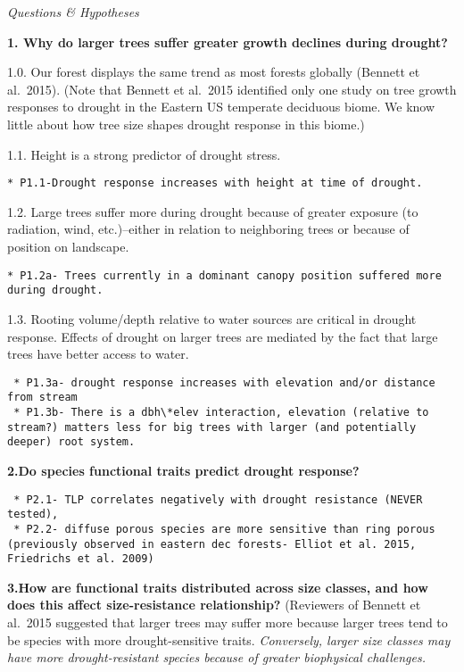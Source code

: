 \documentclass[]{book}
\begin{document}
\emph{Questions \& Hypotheses}

\textbf{1. Why do larger trees suffer greater growth declines during drought?}

1.0. Our forest displays the same trend as most forests globally (Bennett et al.~2015). (Note that Bennett et al.~2015 identified only one study on tree growth responses to drought in the Eastern US temperate deciduous biome. We know little about how tree size shapes drought response in this biome.)

1.1. Height is a strong predictor of drought stress.

\begin{verbatim}
* P1.1-Drought response increases with height at time of drought.
\end{verbatim}

1.2. Large trees suffer more during drought because of greater exposure (to radiation, wind, etc.)--either in relation to neighboring trees or because of position on landscape.

\begin{verbatim}
* P1.2a- Trees currently in a dominant canopy position suffered more during drought. 
\end{verbatim}

1.3. Rooting volume/depth relative to water sources are critical in drought response. Effects of drought on larger trees are mediated by the fact that large trees have better access to water.

\begin{verbatim}
 * P1.3a- drought response increases with elevation and/or distance from stream
 * P1.3b- There is a dbh\*elev interaction, elevation (relative to stream?) matters less for big trees with larger (and potentially deeper) root system.
\end{verbatim}

\textbf{2.Do species functional traits predict drought response?}

\begin{verbatim}
 * P2.1- TLP correlates negatively with drought resistance (NEVER tested), 
 * P2.2- diffuse porous species are more sensitive than ring porous (previously observed in eastern dec forests- Elliot et al. 2015, Friedrichs et al. 2009)
\end{verbatim}

\textbf{3.How are functional traits distributed across size classes, and how does this affect size-resistance relationship?} (Reviewers of Bennett et al.~2015 suggested that larger trees may suffer more because larger trees tend to be species with more drought-sensitive traits. \emph{Conversely, larger size classes may have more drought-resistant species because of greater biophysical challenges.}
\end{document}
